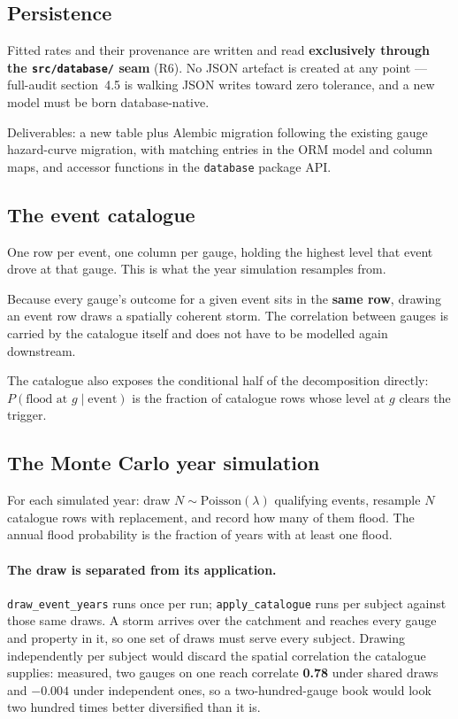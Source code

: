 \documentclass[11pt]{article}
\begin{document}
\subsection{Persistence}

Fitted rates and their provenance are written and read \textbf{exclusively
through the \texttt{src/database/} seam} (R6). No JSON artefact is created at
any point --- full-audit section~4.5 is walking JSON writes toward zero
tolerance, and a new model must be born database-native.

Deliverables: a new table plus Alembic migration following the existing gauge
hazard-curve migration, with matching entries in the ORM model and column maps,
and accessor functions in the \texttt{database} package API.

\subsection{The event catalogue}

One row per event, one column per gauge, holding the highest level that event
drove at that gauge. This is what the year simulation resamples from.

Because every gauge's outcome for a given event sits in the \textbf{same row},
drawing an event row draws a spatially coherent storm. The correlation between
gauges is carried by the catalogue itself and does not have to be modelled
again downstream.

The catalogue also exposes the conditional half of the decomposition directly:
$P(\text{flood at } g \mid \text{event})$ is the fraction of catalogue rows
whose level at $g$ clears the trigger.

\subsection{The Monte Carlo year simulation}
\label{sec:simulation}

For each simulated year: draw $N \sim \text{Poisson}(\lambda)$ qualifying
events, resample $N$ catalogue rows with replacement, and record how many of
them flood. The annual flood probability is the fraction of years with at least
one flood.

\paragraph{The draw is separated from its application.}
\texttt{draw\_event\_years} runs once per run; \texttt{apply\_catalogue} runs
per subject against those same draws. A storm arrives over the catchment and
reaches every gauge and property in it, so one set of draws must serve every
subject. Drawing independently per subject would discard the spatial
correlation the catalogue supplies: measured, two gauges on one reach correlate
\textbf{0.78} under shared draws and \textbf{$-0.004$} under independent ones,
so a two-hundred-gauge book would look two hundred times better diversified
than it is.
\end{document}
